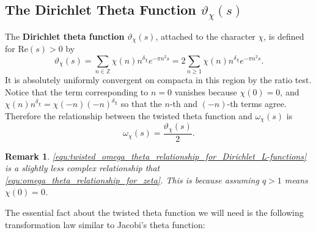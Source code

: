 \documentclass[12pt]{book}
\newtheorem{remark}{Remark}[section]
\theoremstyle{definition}\newframedtheorem{method}{Method}
\newcommand{\Z}{\mathbb{Z}}
\renewcommand{\d}{\delta}
\newcommand{\w}{\omega}
\newcommand{\vt}{\vartheta}
\newcommand{\<}{\langle}
\renewcommand{\>}{\rangle}
\renewcommand{\Re}{\mathrm{Re}}
\begin{document}
    \subsection*{The Dirichlet Theta Function \texorpdfstring{$\vt_{\chi}(s)$}{v_x(s)}}
      The \textbf{Dirichlet theta function} $\vt_{\chi}(s)$, attached to the character $\chi$, is defined for $\Re(s) > 0$ by
      \[
        \vt_{\chi}(s) = \sum_{n \in \Z}\chi(n)n^{\d_{\chi}}e^{-\pi n^{2}s} = 2\sum_{n \ge 1}\chi(n)n^{\d_{\chi}}e^{-\pi n^{2}s}.
      \]
      It is absolutely uniformly convergent on compacta in this region by the ratio test. Notice that the term corresponding to $n = 0$ vanishes because $\chi(0) = 0$, and $\chi(n)n^{\d_{\chi}} = \chi(-n)(-n)^{\d_{\chi}}$ so that the $n$-th and $(-n)$-th terms agree. Therefore the relationship between the twisted theta function and $\w_{\chi}(s)$ is
      \begin{equation}\label{equ:twisted_omega_theta_relationship_for_Dirichlet_L-functions}
        \w_{\chi}(s) = \frac{\vt_{\chi}(s)}{2}.
      \end{equation}

      \begin{remark}
        \cref{equ:twisted_omega_theta_relationship_for_Dirichlet_L-functions} is a slightly less complex relationship that \cref{equ:omega_theta_relationship_for_zeta}. This is because assuming $q > 1$ means $\chi(0) = 0$.
      \end{remark}

      The essential fact about the twisted theta function we will need is the following transformation law similar to Jacobi's theta function:
\end{document}
